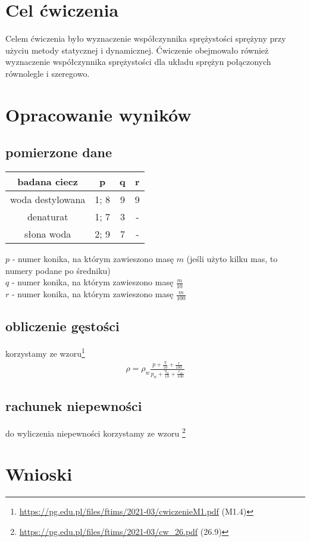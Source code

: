 \documentclass{article}
\begin{document}
\section{Cel ćwiczenia}
Celem ćwiczenia było wyznaczenie współczynnika sprężystości sprężyny przy użyciu metody statycznej i dynamicznej.  Ćwiczenie obejmowało również wyznaczenie współczynnika sprężystości dla układu sprężyn połączonych równolegle i szeregowo.

\section{Opracowanie wyników}
\subsection{pomierzone dane}
\begin{center}
\begin{tabular}{ c | c | c | c }
badana ciecz & p & q & r \\
\hline
 woda destylowana & 1; 8 & 9  &  9  \\ 
 denaturat  & 1; 7 & 3 & - \\  
 słona woda & 2; 9 & 7 & -    

\end{tabular}
\end{center}
$p$ - numer konika,  na którym zawieszono masę $m$ (jeśli użyto kilku mas, to numery podane po średniku)\\
$q$ - numer konika,  na którym zawieszono masę $\frac{m}{10}$ \\
$r$ - numer konika, na którym zawieszono masę $\frac{m}{100}$
\subsection{obliczenie gęstości}
korzystamy ze wzoru\footnote{\url{https://pg.edu.pl/files/ftims/2021-03/cwiczenieM1.pdf} (M1.4)}
\begin{gather*}
	\rho = \rho_w \frac{p+\frac{q}{10} + \frac{r}{100}}{p_w+\frac{q_w}{10} + \frac{r_w}{100}}
\end{gather*} 

\subsection{rachunek niepewności}
do wyliczenia niepewności korzystamy ze wzoru \footnote{\url{https://pg.edu.pl/files/ftims/2021-03/cw_26.pdf} (26.9)}

\section{Wnioski}
\end{document}
